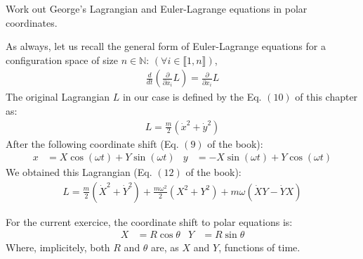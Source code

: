 \documentclass[solutions.tex]{subfiles}
\begin{document}
\maketitle
\begin{exercise}
Work out George's Lagrangian and Euler-Lagrange equations
in polar coordinates.
\end{exercise}
As always, let us recall the general form of Euler-Lagrange equations
for a configuration space of size $n\in\mathbb{N}$:
$(\forall i \in\llbracket 1, n\rrbracket)$,
\begin{align}
	\frac{d}{dt}\left(\frac{\partial}{\partial\dot{x_i}}L\right)
		= \frac{\partial}{\partial x_i}L
	\label{eqn:l06e04:euler-lagrange}
\end{align}
The original Lagrangian $L$ in our case is defined by the Eq. $(10)$
of this chapter as:
\begin{align}
	L = \frac{m}{2}\left(\dot{x}^2+\dot{y}^2\right)
	\label{eqn:l06e04:lagrangian}
\end{align}
After the following coordinate shift (Eq. $(9)$ of the book):
\begin{align}
	x &= X\cos(\omega t) + Y\sin(\omega t)& y &= -X \sin(\omega t)+Y\cos(\omega t)
	\label{eqn:l06e04-1st-shift}
\end{align}
We obtained this Lagrangian (Eq. $(12)$ of the book):
\begin{align}
	L = \frac{m}{2}(\dot{X}^2+\dot{Y}^2)
	  + \frac{m\omega^2}{2}(X^2+Y^2)
	  + m\omega(\dot{X}Y-\dot{Y}X)
	\label{eqn:l06e04:lagrangian-1st-shift}
\end{align}

For the current exercice, the coordinate shift to polar equations is:
\begin{align}
	X &= R \cos\theta & Y &= R \sin\theta
	\label{eqn:l06e04:coordinate-shift}
\end{align}
Where, implicitely, both $R$ and $\theta$ are, as $X$ and $Y$, functions of
time. \\
\end{document}
